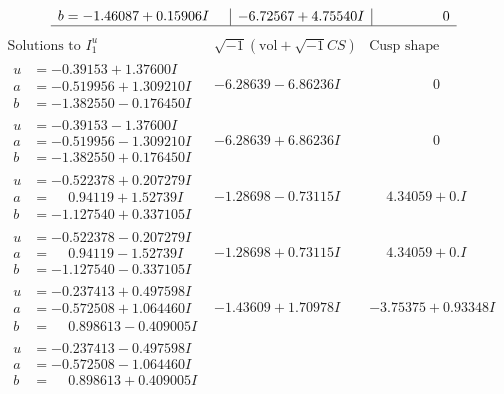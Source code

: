 \documentclass[1p]{elsarticle_modified}
\theoremstyle{definition}
\newcommand{\I}{\sqrt{-1}}
\begin{document}
$$\begin{array}{c|c|c}
\begin{aligned}
b &= -1.46087 + 0.15906 I\end{aligned}
 & -6.72567 + 4.75540 I & \phantom{-0.000000 } 0\\
 \hline 
 \end{array}$$\newpage$$\begin{array}{c|c|c}  
\text{Solutions to }I^u_{1}& \I (\text{vol} + \sqrt{-1}CS) & \text{Cusp shape}\\
 \hline 
\begin{aligned}
u &= -0.39153 + 1.37600 I \\
a &= -0.519956 + 1.309210 I \\
b &= -1.382550 - 0.176450 I\end{aligned}
 & -6.28639 - 6.86236 I & \phantom{-0.000000 } 0 \\ \hline\begin{aligned}
u &= -0.39153 - 1.37600 I \\
a &= -0.519956 - 1.309210 I \\
b &= -1.382550 + 0.176450 I\end{aligned}
 & -6.28639 + 6.86236 I & \phantom{-0.000000 } 0 \\ \hline\begin{aligned}
u &= -0.522378 + 0.207279 I \\
a &= \phantom{-}0.94119 + 1.52739 I \\
b &= -1.127540 + 0.337105 I\end{aligned}
 & -1.28698 - 0.73115 I & \phantom{-}4.34059 + 0. I\phantom{ +0.000000I} \\ \hline\begin{aligned}
u &= -0.522378 - 0.207279 I \\
a &= \phantom{-}0.94119 - 1.52739 I \\
b &= -1.127540 - 0.337105 I\end{aligned}
 & -1.28698 + 0.73115 I & \phantom{-}4.34059 + 0. I\phantom{ +0.000000I} \\ \hline\begin{aligned}
u &= -0.237413 + 0.497598 I \\
a &= -0.572508 + 1.064460 I \\
b &= \phantom{-}0.898613 - 0.409005 I\end{aligned}
 & -1.43609 + 1.70978 I & -3.75375 + 0.93348 I \\ \hline\begin{aligned}
u &= -0.237413 - 0.497598 I \\
a &= -0.572508 - 1.064460 I \\
b &= \phantom{-}0.898613 + 0.409005 I\end{aligned}

\end{array}$$
\end{document}
